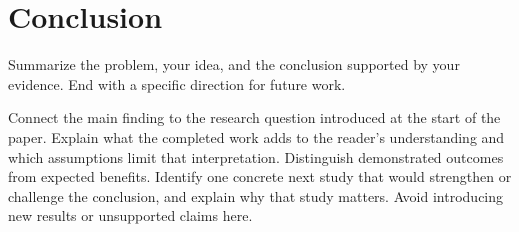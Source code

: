 \section{Conclusion}
\label{sec:conclusion}
Summarize the problem, your idea, and the conclusion supported by your
evidence. End with a specific direction for future work.

Connect the main finding to the research question introduced at the start
of the paper. Explain what the completed work adds to the reader's
understanding and which assumptions limit that interpretation. Distinguish
demonstrated outcomes from expected benefits. Identify one concrete next
study that would strengthen or challenge the conclusion, and explain why
that study matters. Avoid introducing new results or unsupported claims here.
